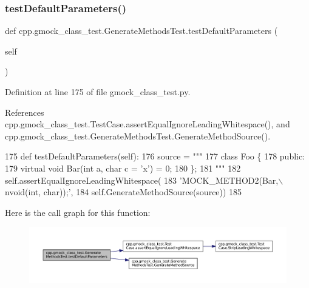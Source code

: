 \subsubsection{\texorpdfstring{test\+Default\+Parameters()}{testDefaultParameters()}}
{\footnotesize\ttfamily def cpp.\+gmock\+\_\+class\+\_\+test.\+Generate\+Methods\+Test.\+test\+Default\+Parameters (\begin{DoxyParamCaption}\item[{}]{self }\end{DoxyParamCaption})}



Definition at line 175 of file gmock\+\_\+class\+\_\+test.\+py.



References cpp.\+gmock\+\_\+class\+\_\+test.\+Test\+Case.\+assert\+Equal\+Ignore\+Leading\+Whitespace(), and cpp.\+gmock\+\_\+class\+\_\+test.\+Generate\+Methods\+Test.\+Generate\+Method\+Source().


\begin{DoxyCode}
175   \textcolor{keyword}{def }testDefaultParameters(self):
176     source = \textcolor{stringliteral}{"""}
177 \textcolor{stringliteral}{class Foo \{}
178 \textcolor{stringliteral}{ public:}
179 \textcolor{stringliteral}{  virtual void Bar(int a, char c = 'x') = 0;}
180 \textcolor{stringliteral}{\};}
181 \textcolor{stringliteral}{"""}
182     self.assertEqualIgnoreLeadingWhitespace(
183         \textcolor{stringliteral}{'MOCK\_METHOD2(Bar,\(\backslash\)nvoid(int, char));'},
184         self.GenerateMethodSource(source))
185 
\end{DoxyCode}
Here is the call graph for this function\+:
\nopagebreak
\begin{figure}[H]
\begin{center}
\leavevmode
\includegraphics[width=350pt]{classcpp_1_1gmock__class__test_1_1GenerateMethodsTest_a61abb614ad02a1fef3ece3813695c22a_cgraph}
\end{center}
\end{figure}
\mbox{\label{classcpp_1_1gmock__class__test_1_1GenerateMethodsTest_abb9fce46de4ac1d2943b85e84ce14c83}} 

